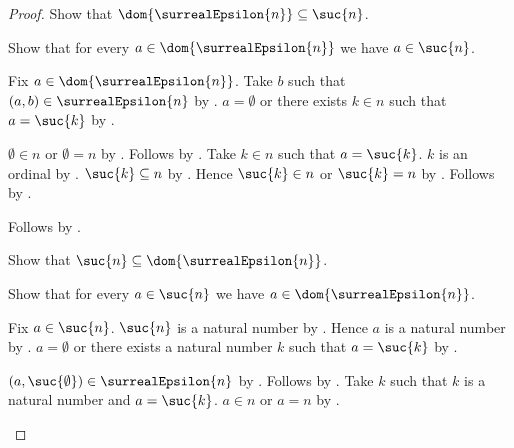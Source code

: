 \begin{proof}
    Show that $\dom{\surrealEpsilon{n}}\subseteq\suc{n}$.
    \begin{subproof}
        Show that for every $a\in\dom{\surrealEpsilon{n}}$ we have
            $a\in\suc{n}$.
        \begin{subproof}
            Fix $a\in\dom{\surrealEpsilon{n}}$.
            Take $b$ such that $(a,b)\in\surrealEpsilon{n}$
                by .
            $a=\emptyset$ or there exists $k\in n$ such that
                $a=\suc{k}$
                by .
            \begin{byCase}
                    $\emptyset\in n$ or $\emptyset=n$
                        by .
                    Follows by .
                    Take $k\in n$ such that $a=\suc{k}$.
                    $k$ is an ordinal by .
                    $\suc{k}\subseteq n$ by .
                    Hence $\suc{k}\in n$ or $\suc{k}=n$
                        by .
                    Follows by .
            \end{byCase}
        \end{subproof}
        Follows by .
    \end{subproof}
    Show that $\suc{n}\subseteq\dom{\surrealEpsilon{n}}$.
    \begin{subproof}
        Show that for every $a\in\suc{n}$ we have
            $a\in\dom{\surrealEpsilon{n}}$.
        \begin{subproof}
            Fix $a\in\suc{n}$.
            $\suc{n}$ is a natural number by .
            Hence $a$ is a natural number
                by .
            $a=\emptyset$ or there exists a natural number $k$ such that
                $a=\suc{k}$
                by .
            \begin{byCase}
                    $(a,\suc{\emptyset})\in\surrealEpsilon{n}$
                        by .
                    Follows by .
                    Take $k$ such that $k$ is a natural number and
                        $a=\suc{k}$.
                    $a\in n$ or $a=n$ by .

\end{byCase}
\end{subproof}
\end{subproof}
\end{proof}
